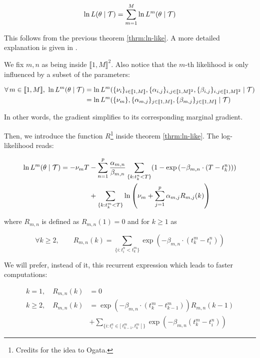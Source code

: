 \documentclass[11pt]{book}
\newcommand{\lsum}[1]{\sum_{ \{k : t_k^#1 < T \} }}
\newcommand{\lexp}[1]{
\exp \left ( - \beta_{m,n} \cdot ( T - t_k^#1 ) \right ) 
}
\newcommand{\denomR}{\nu_m + \sum_{j=1}^p \alpha_{m,j} R_{m,j} (k) }
\begin{document}
\begin{equation}
\ln L( \theta \mid \mathcal{T} ) = \sum_{m = 1}^M \ln L^m( \theta \mid \mathcal{T} )
\label{eq:ln_multi}
\end{equation}

This follows from the previous theorem \ref{thrm:ln-like}. A more detailed explanation is given in \cite{Likelihood_Hawkes}.



We fix $m,n$ as being inside $\llbracket 1, M \rrbracket ^2 $. Also notice that the $m$-th likelihood is only influenced by a subset of the parameters:

\begin{align*}
\forall m \in \llbracket 1, M \rrbracket , \  \ln L^m( \theta \mid \Tau ) &= \ln L^m( 
\{ \nu_i \}_{ i \in  \llbracket 1, M \rrbracket  },
\{ \alpha_{i,j} \} _{ i,j \in  \llbracket 1, M \rrbracket ^2 },
\{ \beta_{i,j} \}_{ i,j \in  \llbracket 1, M \rrbracket ^2 }
\mid \Tau ) \\
&= \ln L^m( 
\{ \nu_m \},
\{ \alpha_{m,j} \} _{ j \in  \llbracket 1, M \rrbracket  },
\{ \beta_{m,j} \}_{j \in  \llbracket 1, M \rrbracket  }
\mid \Tau )
\end{align*}

In other words, the gradient simplifies to its corresponding marginal gradient. 

Then, we introduce the function $R$\footnote{Credits for the idea to Ogata.} inside theorem \ref{thrm:ln-like}. The log-likelihood reads:


\begin{align}
\ln L^m( \theta \mid \Tau ) = - \nu_m T &- \sum^p_{n=1} \frac {\alpha_{m,n} } {\beta_{m,n}}  \lsum{n} (1 - \lexp{n}) \notag \\ 
&+ \lsum{m} \ln \left ( \denomR \right ) 
\end{align}

where $R_{m,n}$ is defined as $R_{m,n}(1) = 0 $ and for $k \geq 1$ as  

\begin{equation*}
\forall k \geq 2, \qquad R_{m,n} (k) = \sum_{ \{i : t_i^n < t_k^m \} } \exp \left ( - \beta_{m,n} \cdot ( t_k^m - t_i^n )  \right ) 
\end{equation*}

We will prefer, instead of it, this recurrent expression which leads to faster computations:

\begin{align*}
k = 1, \quad R_{m,n} (k) &= 0 \\
k \geq 2, \quad R_{m,n} (k) &= \exp ( - \beta_{m,n} \cdot ( t_k^m - t^m_{k-1} ) ) R_{m,n} (k-1) \\ 
& + \sum_{ \{i: t_i^n \in [ \ t_{k-1}^m, t_k^m \ [ \  \} } \exp ( - \beta_{m,n} ( t^m_k - t_i^n ) )
\end{align*}
\end{document}
